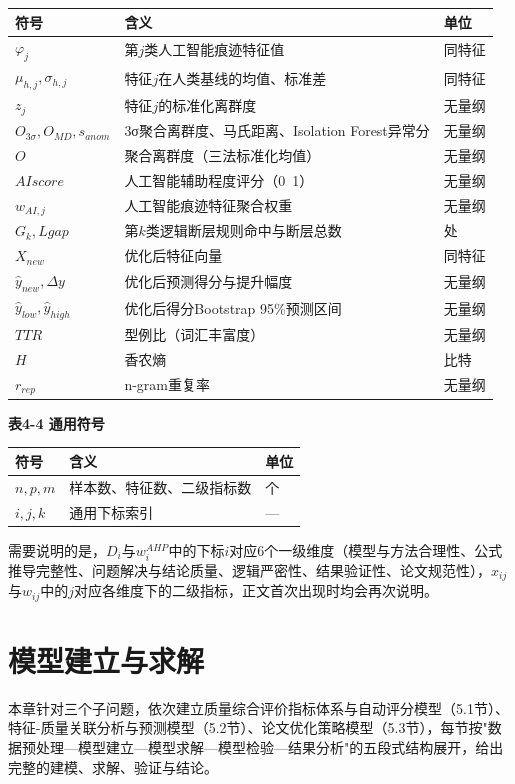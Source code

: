 \documentclass[withoutpreface]{cumcmthesis}
\begin{document}
\begin{table}[htbp]
\centering
\small
\begin{tabularx}{\textwidth}{XXX}
\toprule
符号 & 含义 & 单位 \\
\midrule
$\varphi_j$ & 第$j$类人工智能痕迹特征值 & 同特征 \\
$\mu_{h,j},\sigma_{h,j}$ & 特征$j$在人类基线的均值、标准差 & 同特征 \\
$z_j$ & 特征$j$的标准化离群度 & 无量纲 \\
$O_{3\sigma},O_{MD},s_{anom}$ & 3σ聚合离群度、马氏距离、Isolation Forest异常分 & 无量纲 \\
$O$ & 聚合离群度（三法标准化均值） & 无量纲 \\
$AIscore$ & 人工智能辅助程度评分（0~1） & 无量纲 \\
$w_{AI,j}$ & 人工智能痕迹特征聚合权重 & 无量纲 \\
$G_k,Lgap$ & 第$k$类逻辑断层规则命中与断层总数 & 处 \\
$X_{new}$ & 优化后特征向量 & 同特征 \\
$\hat y_{new},\Delta y$ & 优化后预测得分与提升幅度 & 无量纲 \\
$\hat y_{low},\hat y_{high}$ & 优化后得分Bootstrap 95\%预测区间 & 无量纲 \\
$TTR$ & 型例比（词汇丰富度） & 无量纲 \\
$H$ & 香农熵 & 比特 \\
$r_{rep}$ & n-gram重复率 & 无量纲 \\
\bottomrule
\end{tabularx}
\end{table}
\textbf{表4-4 通用符号}

\begin{table}[htbp]
\centering
\small
\begin{tabularx}{\textwidth}{XXX}
\toprule
符号 & 含义 & 单位 \\
\midrule
$n,p,m$ & 样本数、特征数、二级指标数 & 个 \\
$i,j,k$ & 通用下标索引 & — \\
\bottomrule
\end{tabularx}
\end{table}
需要说明的是，$D_i$与$w_i^{AHP}$中的下标$i$对应6个一级维度（模型与方法合理性、公式推导完整性、问题解决与结论质量、逻辑严密性、结果验证性、论文规范性），$x_{ij}$与$w_{ij}$中的$j$对应各维度下的二级指标，正文首次出现时均会再次说明。

\section{模型建立与求解}
本章针对三个子问题，依次建立质量综合评价指标体系与自动评分模型（5.1节）、特征-质量关联分析与预测模型（5.2节）、论文优化策略模型（5.3节），每节按"数据预处理—模型建立—模型求解—模型检验—结果分析"的五段式结构展开，给出完整的建模、求解、验证与结论。
\end{document}
